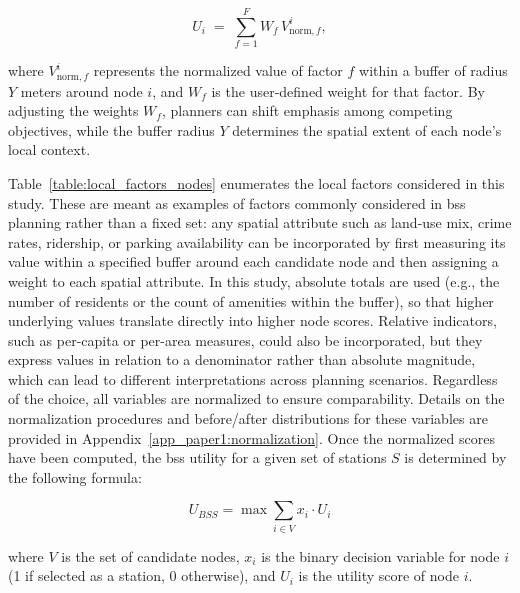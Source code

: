             \begin{equation} \label{eq:node_utility}
                U_i \;=\;\sum_{f=1}^F W_f\,V_{\mathrm{norm},f}^i,
            \end{equation}

        where \(V_{\mathrm{norm},f}^i\) represents the normalized value of factor \(f\) within a buffer of radius \(Y\) meters around node \(i\), and \(W_f\) is the user-defined weight for that factor. By adjusting the weights \(W_f\), planners can shift emphasis among competing objectives, while the buffer radius \(Y\) determines the spatial extent of each node’s local context.

        Table~\ref{table:local_factors_nodes} enumerates the local factors considered in this study. These are meant as examples of factors commonly considered in \ac{bss} planning rather than a fixed set: any spatial attribute such as land‐use mix, crime rates, ridership, or parking availability can be incorporated by first measuring its value within a specified buffer around each candidate node and then assigning a weight to each spatial attribute. In this study, absolute totals are used (e.g., the number of residents or the count of amenities within the buffer), so that higher underlying values translate directly into higher node scores. Relative indicators, such as per-capita or per-area measures, could also be incorporated, but they express values in relation to a denominator rather than absolute magnitude, which can lead to different interpretations across planning scenarios. Regardless of the choice, all variables are normalized to ensure comparability. Details on the normalization procedures and before/after distributions for these variables are provided in Appendix~\ref{app_paper1:normalization}. Once the normalized scores have been computed, the \ac{bss} utility for a given set of stations $S$ is determined by the following formula:

            \begin{equation}\label{eq:BSS_utility_no_metrics}
                    U_{BSS} = \max \sum_{i\in V} x_i \cdot U_i
            \end{equation}

        where $V$ is the set of candidate nodes, $x_i$ is the binary decision variable for node $i$ (1 if selected as a station, 0 otherwise), and $U_i$ is the utility score of node $i$.


